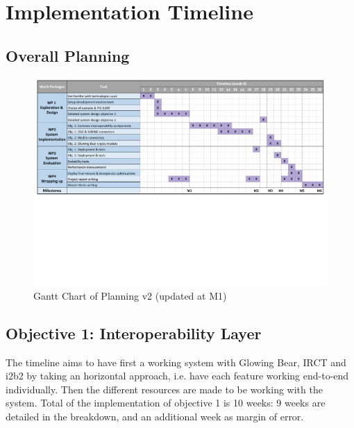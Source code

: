 \chapter{Implementation Timeline}
\section{Overall Planning}

\begin{figure}[h!]
    \centering
    \includegraphics[width=1\textwidth,trim={0 9cm 0 0},clip]{figures/gantt_chartt_v2.pdf}
    \caption{Gantt Chart of Planning v2 (updated at M1)}
    \label{fig:overallplanning}
\end{figure}


\section{Objective 1: Interoperability Layer}

The timeline aims to have first a working system with Glowing Bear, IRCT and i2b2 by taking an horizontal approach, i.e. have each feature working end-to-end individually.
Then the different resources are made to be working with the system.
Total of the implementation of objective 1 is 10 weeks: 9 weeks are detailed in the breakdown, and an additional week as margin of error.

